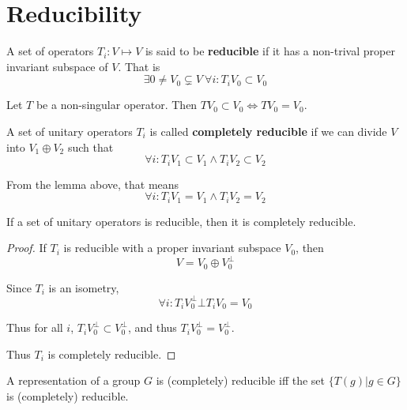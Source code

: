 \documentclass[12pt]{book}
\begin{document}
	\section{Reducibility}
	
	\begin{definition}
	A set of operators $T_i:V\mapsto V$ is said to be {\bf reducible} if it has a non-trival proper invariant subspace of $V$. That is
	\begin{equation}
		\exists 0\neq V_0\subsetneq V\ \forall i:T_iV_0\subset V_0
	\end{equation}
	\end{definition}

	
	\begin{lemma}
		Let $T$ be a non-singular operator. Then $T V_0\subset V_0\iff T V_0=V_0$.
	\end{lemma}
	
	\begin{definition}
	A set of unitary operators $T_i$ is called {\bf completely reducible} if we can divide $V$ into $V_1\oplus V_2$ such that
	\begin{equation}
	\forall i:T_iV_1\subset V_1\wedge T_iV_2\subset V_2
	\end{equation}
	
	From the lemma above, that means
	\begin{equation}
	\forall i:T_iV_1=V_1\wedge T_iV_2=V_2
	\end{equation}
	
	\end{definition}
	\begin{theorem}
		If a set of unitary operators is reducible, then it is completely reducible.
	\end{theorem}
	\begin{proof}
		If $T_i$ is reducible with a proper invariant subspace $V_0$, then
		\begin{equation}
		V=V_0\oplus V_0^\bot
		\end{equation}
		
		Since $T_i$ is an isometry,
		\begin{equation}
		\forall i:T_iV_0^\bot\bot T_iV_0=V_0
		\end{equation}
		
		Thus for all $i$, $T_iV_0^\bot\subset V_0^\bot$, and thus $T_iV_0^\bot= V_0^\bot$.
		
		Thus $T_i$ is completely reducible.
	\end{proof}
	
	\begin{definition}
	A representation of a group $G$ is (completely) reducible iff the set $\{T(g)|g\in G\}$ is (completely) reducible.
	\end{definition}
	
\end{document}
